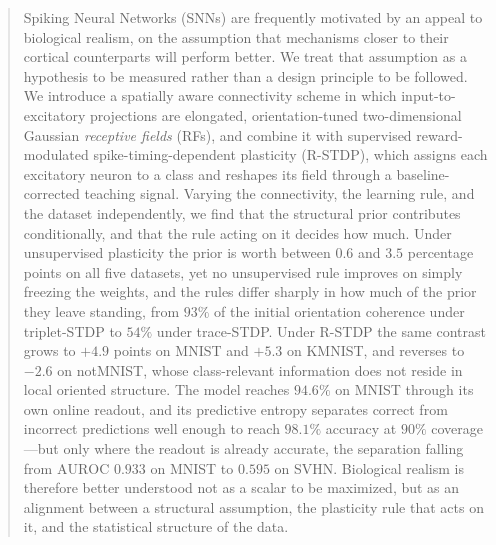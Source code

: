 \begin{abstract}
Spiking Neural Networks (SNNs) are frequently motivated by an appeal to biological
realism, on the assumption that mechanisms closer to their cortical counterparts will
perform better. We treat that assumption as a hypothesis to be measured rather than a
design principle to be followed. We introduce a spatially aware connectivity scheme in
which input-to-excitatory projections are elongated, orientation-tuned two-dimensional
Gaussian \textit{receptive fields} (RFs), and combine it with supervised reward-modulated
spike-timing-dependent plasticity (R-STDP), which assigns each excitatory neuron to a
class and reshapes its field through a baseline-corrected teaching signal. Varying the
connectivity, the learning rule, and the dataset independently, we find that the
structural prior contributes conditionally, and that the rule acting on it decides how
much. Under unsupervised plasticity the prior is worth between $0.6$ and $3.5$ percentage
points on all five datasets, yet no unsupervised rule improves on simply freezing the
weights, and the rules differ sharply in how much of the prior they leave standing, from
$93\%$ of the initial orientation coherence under triplet-STDP to $54\%$ under
trace-STDP. Under R-STDP the same contrast grows to $+4.9$ points on MNIST and $+5.3$ on
KMNIST, and reverses to $-2.6$ on notMNIST, whose class-relevant information does not
reside in local oriented structure. The model reaches $94.6\%$ on MNIST through its own
online readout, and its predictive entropy separates correct from incorrect predictions
well enough to reach $98.1\%$ accuracy at $90\%$ coverage---but only where the readout is
already accurate, the separation falling from $\mathrm{AUROC}$ $0.933$ on MNIST to
$0.595$ on SVHN. Biological realism is therefore better understood not as a scalar to be
maximized, but as an alignment between a structural assumption, the plasticity rule that
acts on it, and the statistical structure of the data.
\end{abstract}
